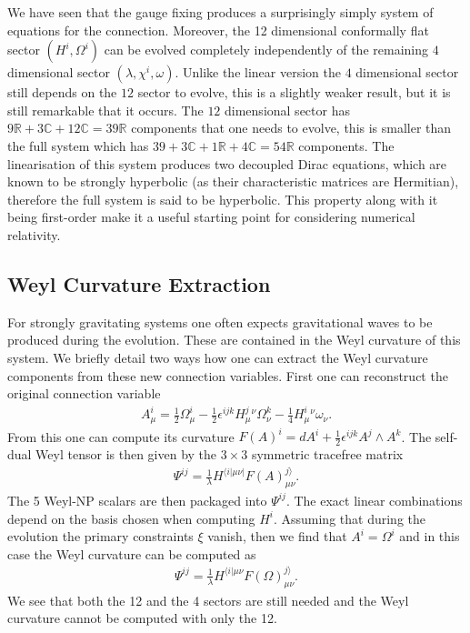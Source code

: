 \documentclass[10pt]{report}
\theoremstyle{definition}
\newcommand{\R}[0]{\mathbb{R}}
\newcommand{\C}[0]{\mathbb{C}}
\begin{document}
        We have seen that the gauge fixing produces a surprisingly simply system of equations for the connection. Moreover, the 12 dimensional conformally flat sector $(H^i,\Omega^i)$ can be evolved completely independently of the remaining $4$ dimensional sector $(\lambda,\chi^i,\omega)$. Unlike the linear version the $4$ dimensional sector still depends on the $12$ sector to evolve, this is a slightly weaker result, but it is still remarkable that it occurs. The $12$ dimensional sector has $9\R + 3\C + 12 \C = 39\R$ components that one needs to evolve, this is smaller than the full system which has $39 + 3\C + 1 \R + 4 \C = 54\R$ components. The linearisation of this system produces two decoupled Dirac equations, which are known to be strongly hyperbolic (as their characteristic matrices are Hermitian), therefore the full system is said to be hyperbolic. This property along with it being first-order make it a useful starting point for considering numerical relativity.

        \subsection{Weyl Curvature Extraction}
        For strongly gravitating systems one often expects gravitational waves to be produced during the evolution. These are contained in the Weyl curvature of this system. We briefly detail two ways  how one can extract the Weyl curvature components from these new connection variables. First one can reconstruct the original connection variable 
        \begin{align}
            A^i_\mu = \frac{1}{2} \Omega^i_\mu - \frac{1}{2} \epsilon^{ijk} H^j_\mu{}^\nu \Omega^k_\nu - \frac{1}{4} H^i_\mu{}^\nu \omega_\nu.
        \end{align}
        From this one can compute its curvature $F(A)^i = dA^i + \frac{1}{2} \epsilon^{ijk} A^j \wedge A^k$. The self-dual Weyl tensor is then given by the $3 \times 3$ symmetric tracefree matrix 
        \begin{align}
            \Psi^{ij} = \frac{1}{\lambda} H^{\langle i|\mu\nu|} F(A)^{j\rangle}_{\mu\nu}.
        \end{align}
        The 5 Weyl-NP scalars are then packaged into $\Psi^{ij}$. The exact linear combinations depend on the basis chosen when computing $H^i$. Assuming that during the evolution the primary constraints $\xi$ vanish, then we find that $A^i = \Omega^i$ and in this case the Weyl curvature can be computed as 
        \begin{align}
            \Psi^{ij} = \frac{1}{\lambda} H^{\langle i|\mu\nu} F(\Omega)^{j\rangle}_{\mu\nu}.
        \end{align}
        We see that both the 12 and the 4 sectors are still needed and the Weyl curvature cannot be computed with only the 12.
    
\end{document}
